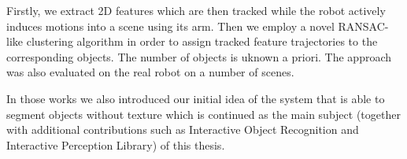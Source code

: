 Firstly, we extract 2D features which are then tracked while the robot actively induces
motions into a scene using its arm. Then we employ a novel RANSAC-like clustering algorithm in order to assign tracked feature trajectories to the corresponding objects. The number of objects is uknown a priori. The approach was also evaluated on the real robot on a number of scenes.

In those works we also introduced our initial idea of the system that is able to segment objects without texture which is continued as the main subject (together with additional contributions such as Interactive Object Recognition and Interactive Perception Library) of this thesis.  

